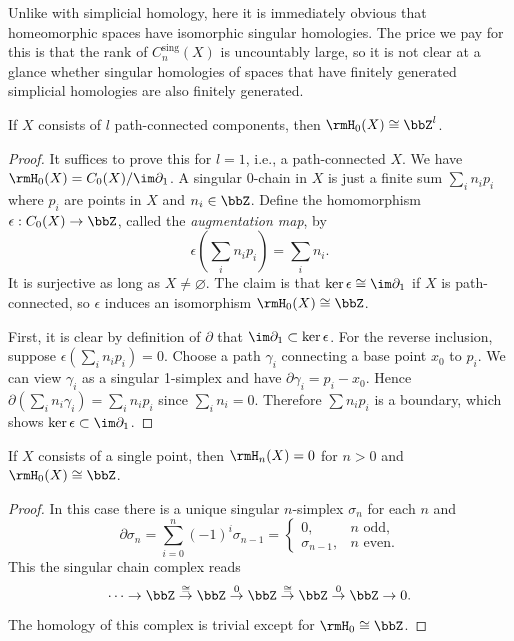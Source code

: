 Unlike with simplicial homology, here it is immediately obvious that homeomorphic spaces have isomorphic singular homologies. The price we pay for this is that the rank of $C^{\text{sing}}_n(X)$ is uncountably large, so it is not clear at a glance whether singular homologies of spaces that have finitely generated simplicial homologies are also finitely generated. 

\begin{prop}
    If $X$ consists of $l$ path-connected components, then $\rmH_0(X)\cong \bbZ^l$.
\end{prop}
\begin{proof}
     It suffices to prove this for $l=1$, i.e., a path-connected $X$. We have $\rmH_0(X)=C_0(X)/\im\partial_1$. A singular 0-chain in $X$ is just a finite sum $\sum_i n_i p_i$ where $p_i$ are points in $X$ and $n_i\in\bbZ$. Define the homomorphism $\epsilon:C_0(X)\to \bbZ$, called the \emph{augmentation map}, by
     \[\epsilon\left(\sum_i n_i p_i\right)=\sum_i n_i.\]
     It is surjective as long as $X\neq\varnothing$. The claim is that $\ker\epsilon\cong\im\partial_1$ if $X$ is path-connected, so $\epsilon $ induces an isomorphism $\rmH_0(X)\cong \bbZ$.
     
     First, it is clear by definition of $\partial$ that $\im\partial_1\subset\ker\epsilon$. For the reverse inclusion, suppose $\epsilon(\sum_i n_i p_i)=0$. Choose a path $\gamma_i$ connecting a base point $x_0$ to $p_i$. We can view $\gamma_i$ as a singular 1-simplex and have $\partial\gamma_i=p_i-x_0$. Hence $\partial(\sum_i n_i\gamma_i)=\sum_i n_i p_i$ since $\sum_i n_i=0$. Therefore $\sum n_i p_i$ is a boundary, which shows $\ker\epsilon\subset\im\partial_1$.
\end{proof}

\begin{prop}
    If $X$ consists of a single point, then $\rmH_n(X)=0$ for $n>0$ and $\rmH_0(X)\cong \bbZ$.
\end{prop}
\begin{proof}
     In this case there is a unique singular $n$-simplex $\sigma_n$ for each $n$ and 
     \[\partial\sigma_n=\sum_{i=0}^n(-1)^i\sigma_{n-1}=\begin{cases}
     0,& n\text{ odd},\\
     \sigma_{n-1},& n\text{ even}.
     \end{cases}\]
     This the singular chain complex reads
     \[\cdots\to \bbZ\overset\cong\to \bbZ\overset 0\to \bbZ\overset\cong\to\bbZ\overset 0\to\bbZ\to 0.\]
     The homology of this complex is trivial except for $\rmH_0\cong \bbZ $.
\end{proof}

